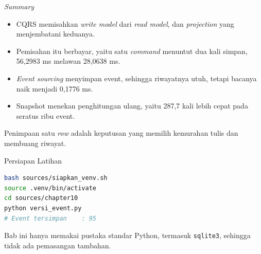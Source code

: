 \documentclass[aspectratio=169, table, 12pt]{beamer}
\begin{document}
\begin{frame}{{\Large \textit{Summary}}}
  \vspace{10pt}
  \begin{itemize}\small
    \item CQRS memisahkan \textit{write model} dari \textit{read model}, dan
          \textit{projection} yang menjembatani keduanya.
    \item Pemisahan itu berbayar, yaitu satu \textit{command} menuntut dua kali simpan,
          56,2983 ms melawan 28,0638 ms.
    \item \textit{Event sourcing} menyimpan event, sehingga riwayatnya
          utuh, tetapi bacanya naik menjadi 0,1776 ms.
    \item Snapshot menekan penghitungan ulang, yaitu 287,7 kali lebih cepat pada
          seratus ribu event.
  \end{itemize}

  \vspace{10pt}
  {\small Penimpaan satu \textit{row} adalah keputusan yang memilih
  kemurahan tulis dan membuang riwayat.}
\end{frame}

\begin{frame}[fragile]{{\Large Persiapan Latihan}}
  \vspace{5pt}
\begin{lstlisting}[language=bash]
bash sources/siapkan_venv.sh
source .venv/bin/activate
cd sources/chapter10
python versi_event.py
# Event tersimpan    : 95
\end{lstlisting}

  \vspace{6pt}
  {\small Bab ini hanya memakai pustaka standar Python, termasuk
  \texttt{sqlite3}, sehingga tidak ada pemasangan tambahan.}
\end{frame}
\end{document}
